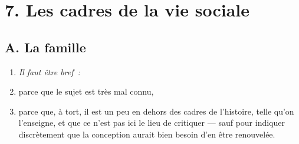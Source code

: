 \documentclass[french,twoside]{book} %
\newlength{\listmod}
\newcommand{\listhead}[1]{\hspace{-1\listmod}\emph{#1}}
\newcommand\chapteropen{} %
\newcommand\chaptercont{} %
\newcommand\chapterclose{} %
\begin{document}
\chapterclose


\chapteropen
\chapter[{7. Les cadres de la vie sociale}]{\textsc{7. }Les cadres de la vie sociale}
\label{c07}\renewcommand{\leftmark}{\textsc{7. }Les cadres de la vie sociale}


\chaptercont
\section[{A. La famille}]{A. La famille}
\label{c07a}
\label{p55}
\begin{enumerate}[itemsep=0pt,]
\item[]\listhead{Il faut être bref :}
\item parce que le sujet est très mal connu,
\item parce que, à tort, il est un peu en dehors des cadres de l’histoire, telle qu’on l’enseigne, et que ce n’est pas ici le lieu de critiquer — sauf pour indiquer discrètement que la conception aurait bien besoin d’en être renouvelée.
\end{enumerate}
\end{document}
